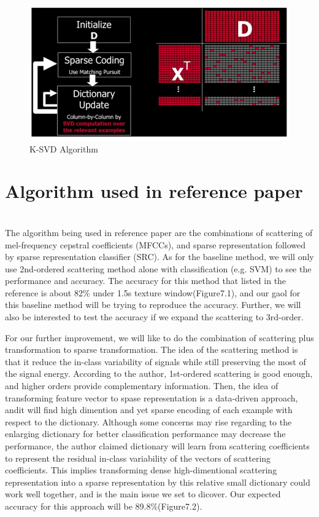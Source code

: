 \documentclass[final]{siamltexmm}
\begin{document}
\begin{figure}[ht]
\begin{center}
  \includegraphics[scale=0.8]{Figure4.png}
  \caption{K-SVD Algorithm}
\end{center}
\end{figure}

\section{Algorithm used in reference paper} \\
The algorithm being used in reference paper are the combinations of scattering of mel-frequency cepstral coefficients (MFCCs), and sparse representation followed by sparse representation classifier (SRC). As for the baseline method, we will only use 2nd-ordered scattering method alone with classification (e.g. SVM) to see the performance and accuracy. The accuracy for this method that listed in the reference is about 82\% under 1.5s texture window(Figure7.1), and our gaol for this baseline method will be trying to reproduce the accuracy. Further, we will also be interested to test the accuracy if we expand the scattering to 3rd-order.

For our further improvement, we will like to do the combination of scattering plus transformation to sparse transformation. The idea of the scattering method is that it reduce the in-class variability of signals while still preserving the most of the signal energy. According to the author, 1st-ordered scattering is good enough, and higher orders provide complementary information.  Then, the idea of transforming feature vector to spase representation is a data-driven approach, andit will find high dimention and yet sparse encoding of each example with respect to the dictionary. Although some concerns may rise regarding to the enlarging dictionary for better classification performance may decrease the performance, the author claimed dictionary will learn from scattering coefficients to represent the residual in-class variability of the vectors of scattering coefficients. This implies transforming dense high-dimentional scattering representation into a sparse representation by this relative small dictionary could work well together, and is the main issue we set to dicover. Our expected accuracy for this approach will be 89.8\%(Figure7.2).
\end{document}
